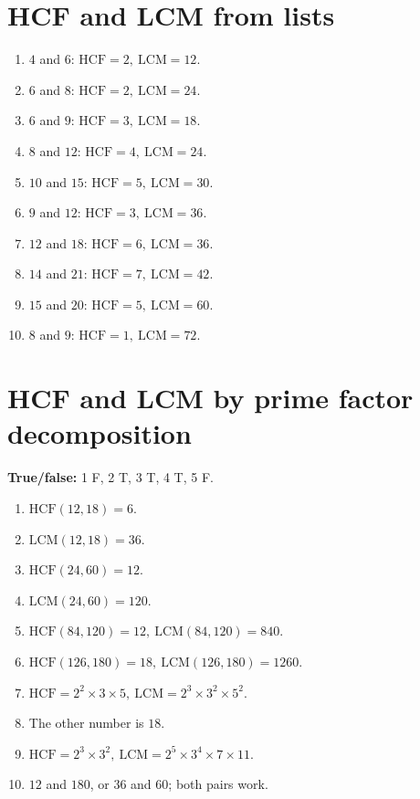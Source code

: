 \documentclass{article}
\begin{document}
\section*{HCF and LCM from lists}
\begin{enumerate}[label=\arabic*., nosep, leftmargin=*]
\item \(4\) and \(6\): \(\mathrm{HCF}=2,\ \mathrm{LCM}=12\).
\item \(6\) and \(8\): \(\mathrm{HCF}=2,\ \mathrm{LCM}=24\).
\item \(6\) and \(9\): \(\mathrm{HCF}=3,\ \mathrm{LCM}=18\).
\item \(8\) and \(12\): \(\mathrm{HCF}=4,\ \mathrm{LCM}=24\).
\item \(10\) and \(15\): \(\mathrm{HCF}=5,\ \mathrm{LCM}=30\).
\item \(9\) and \(12\): \(\mathrm{HCF}=3,\ \mathrm{LCM}=36\).
\item \(12\) and \(18\): \(\mathrm{HCF}=6,\ \mathrm{LCM}=36\).
\item \(14\) and \(21\): \(\mathrm{HCF}=7,\ \mathrm{LCM}=42\).
\item \(15\) and \(20\): \(\mathrm{HCF}=5,\ \mathrm{LCM}=60\).
\item \(8\) and \(9\): \(\mathrm{HCF}=1,\ \mathrm{LCM}=72\).
\end{enumerate}

\section*{HCF and LCM by prime factor decomposition}
\textbf{True/false:} 1 F, 2 T, 3 T, 4 T, 5 F.

\begin{enumerate}[label=\arabic*., nosep, leftmargin=*]
\item \(\mathrm{HCF}(12,18)=6\).
\item \(\mathrm{LCM}(12,18)=36\).
\item \(\mathrm{HCF}(24,60)=12\).
\item \(\mathrm{LCM}(24,60)=120\).
\item \(\mathrm{HCF}(84,120)=12,\ \mathrm{LCM}(84,120)=840\).
\item \(\mathrm{HCF}(126,180)=18,\ \mathrm{LCM}(126,180)=1260\).
\item \(\mathrm{HCF}=2^2\times3\times5,\ \mathrm{LCM}=2^3\times3^2\times5^2\).
\item The other number is \(18\).
\item \(\mathrm{HCF}=2^3\times3^2,\ \mathrm{LCM}=2^5\times3^4\times7\times11\).
\item \(12\) and \(180\), or \(36\) and \(60\); both pairs work.
\end{enumerate}
\end{document}
